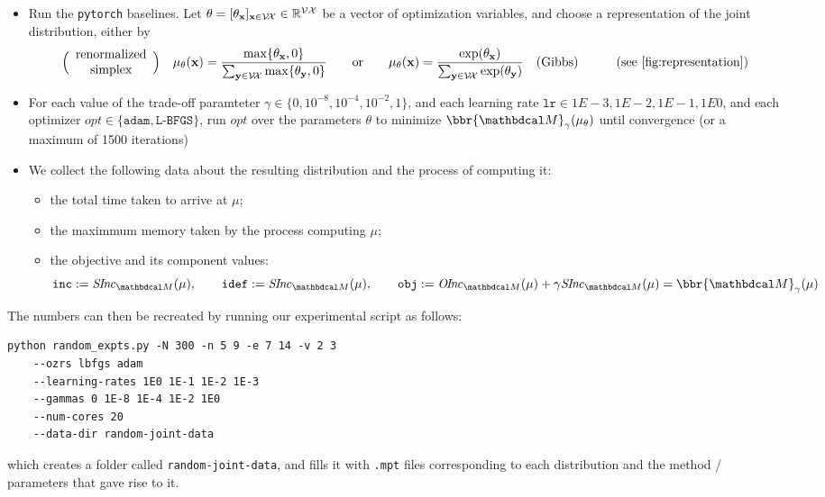 \begin{subappendices}
\begin{itemize}
    \item Run the \texttt{pytorch} baselines.
    Let $\theta = [\theta_{\mathbf x}]_{\mathbf x \in \mathcal V\!\mathcal X} \in \mathbb R^{\mathcal V\mathcal X}$ be a vector of optimization variables, and choose a representation of the joint distribution, either by
    \[
        \Big(\begin{array}{c}\text{renormalized}\\
        \text{simplex}\end{array}\Big)\quad
        \mu_{\theta}(\mat x) = \frac{\max\{\theta_{\mat x}, 0\} }
            {\sum_{\mat y \in \V\!\X}\max\{\theta_{\mat y}, 0\} }
    \qquad\text{or}\qquad
    \mu_{\theta}(\mat x) = \frac{\exp(\theta_{\mat x})}{\sum_{\mat y \in \V\!\X} \exp(\theta_{\mat y})}\quad(\text{Gibbs})
    \qquad\quad\text{(see \cref{fig:representation})}
    \]
    \item
    For each value of the trade-off paramteter 
    $\gamma \in \{0, 10^{-8}, 10^{-4}, 10^{-2}, 1\}$, and each learning rate $\texttt{lr} \in 1E-3, 1E-2, 1E-1, 1E0$, and each optimizer $\mathit{opt} \in \{\texttt{adam}, \texttt{L-BFGS}\}$,
    run $\mathit{opt}$ over the parameters $\theta$ to minimize $\bbr{\dg M}_\gamma(\mu_{\theta})$
     until convergence (or a maximum of 1500 iterations)

     \item We collect the following data about the resulting distribution and the process of computing it:
     \begin{itemize}[nosep]
         \item the total time taken to arrive at $\mu$;
         \item the maximmum memory taken by the process computing $\mu$;
         \item the objective and its component values:
         \vspace{-1ex}
         \[
            \texttt{inc} := \SInc_{\dg M}(\mu),
            \qquad \texttt{idef} := \SInc_{\dg M}(\mu),
            \qquad \texttt{obj} := \OInc_{\dg M}(\mu) + \gamma \SInc_{\dg M}(\mu) = \bbr{\dg M}_\gamma(\mu)
        \]
     \end{itemize}
\end{itemize}



The numbers can then be recreated by running our experimental script as follows:
\begin{verbatim}
python random_expts.py -N 300 -n 5 9 -e 7 14 -v 2 3
    --ozrs lbfgs adam
    --learning-rates 1E0 1E-1 1E-2 1E-3
    --gammas 0 1E-8 1E-4 1E-2 1E0
    --num-cores 20
    --data-dir random-joint-data
\end{verbatim}
which creates a folder called \verb|random-joint-data|,
and fills it with \verb|.mpt| files corresponding to each distribution
and the method / parameters that gave rise to it.


\end{subappendices}

